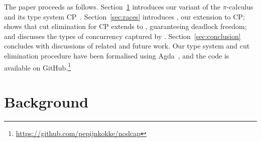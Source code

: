 \documentclass[a4paper,UKenglish]{lipics-v2016}
\begin{document}

The paper proceeds as follows.  Section~\ref{sec:background} introduces our
variant of the $\pi$-calculus and its type system CP~\cite{wadler2012}.
Section~\ref{sec:races} introduces \nodcap, our extension to CP; shows that cut
elimination for CP extends to \nodcap, guaranteeing deadlock freedom; and
discusses the types of concurrency captured by \nodcap.
Section~\ref{sec:conclusion} concludes with discussions of related and future work.
%
Our type system and cut elimination procedure
have been formalised using Agda~\cite{norell2009}, and the code is
available on GitHub.\footnote{%
  \url{https://github.com/pepijnkokke/nodcap}
}

\section{Background}
\label{sec:background}
\end{document}
